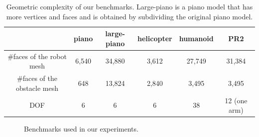 \begin{table}[htb]
\begin{center}
\begin{tabular}{|c|c|c|c|c|c|}\hline
&piano & large-piano & helicopter & humanoid & PR2 \\ \hline \hline
\#faces of the robot mesh & 6,540 & 34,880 & 3,612 &  27,749 & 31,384\\ \hline
\#faces of the obstacle mesh & 648 & 13,824 & 2,840 & 3,495 & 3,495\\ \hline
DOF & 6 & 6 & 6 & 38 & 12 (one arm) \\ \hline
\end{tabular}
\caption[Geometric complexity of benchmarks for testing GPU-based collisions]{Geometric complexity of our benchmarks. Large-piano is a piano model that has more vertices and faces and is obtained by subdividing the original piano model.}
\label{tab:5:geom-complexity}
\end{center}
\end{table}

\begin{figure}[htb]
    \caption[Benchmarks used for testing GPU-based parallel collisions]{Benchmarks used in our experiments.}
    \label{fig:5:benchmarks}
\end{figure}

